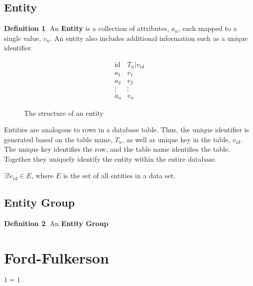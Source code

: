 \documentclass[12pt,letterpaper,oneside,draft]{report}
\theoremstyle{definition}
\newtheorem{defn}{Definition}
\begin{document}
			\subsection{Entity}
				\begin{defn}
					An \textbf{Entity} is a collection of attributes, $a_n$, each mapped to a single value, $v_n$.  An entity also includes additional information such as a unique identifier.

					\begin{figure}[!ht]
						\centering
						\[
							\begin{array}{ll}
								\mathrm{id} & T_n|v_{id} \\
								a_1 & v_1 \\
								a_2 & v_2 \\
								\vdots & \vdots \\
								a_n & v_n
							\end{array}
						\]
						\caption{The structure of an entity}
						\label{fig:entity-rep}
					\end{figure}

					Entities are analogous to rows in a database table.  Thus, the unique identifier is generated based on the table name, $T_n$, as well as unique key in the table, $v_{id}$.  The unique key identifies the row, and the table name identifies the table.  Together they uniquely identify the entity within the entire database.

					$\exists! e_{id} \in E$, where $E$ is the set of all entities in a data set.
				\end{defn}

			\subsection{Entity Group}
				\begin{defn}
					An \textbf{Entity Group}
				\end{defn}

		\section{Ford-Fulkerson}
			\begin{algorithm}
				\begin{algorithmic}
					\ENSURE $1=1$
				\end{algorithmic}
			\end{algorithm}
\end{document}
